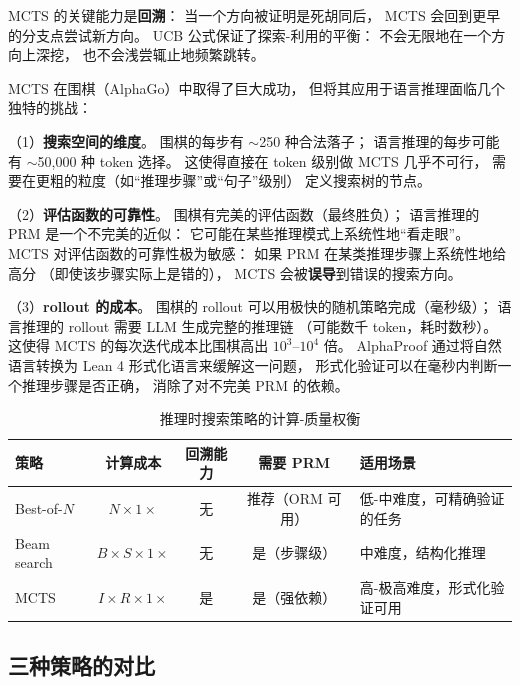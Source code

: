 MCTS 的关键能力是\textbf{回溯}：
当一个方向被证明是死胡同后，
MCTS 会回到更早的分支点尝试新方向。
UCB 公式保证了探索-利用的平衡：
不会无限地在一个方向上深挖，
也不会浅尝辄止地频繁跳转。

\begin{whybox}
MCTS 在围棋（AlphaGo）中取得了巨大成功，
但将其应用于语言推理面临几个独特的挑战：

（1）\textbf{搜索空间的维度}。
围棋的每步有 $\sim$250 种合法落子；
语言推理的每步可能有 $\sim$50,000 种 token 选择。
这使得直接在 token 级别做 MCTS 几乎不可行，
需要在更粗的粒度（如“推理步骤”或“句子”级别）
定义搜索树的节点。

（2）\textbf{评估函数的可靠性}。
围棋有完美的评估函数（最终胜负）；
语言推理的 PRM 是一个不完美的近似：
它可能在某些推理模式上系统性地“看走眼”。
MCTS 对评估函数的可靠性极为敏感：
如果 PRM 在某类推理步骤上系统性地给高分
（即使该步骤实际上是错的），
MCTS 会被\textbf{误导}到错误的搜索方向。

（3）\textbf{rollout 的成本}。
围棋的 rollout 可以用极快的随机策略完成（毫秒级）；
语言推理的 rollout 需要 LLM 生成完整的推理链
（可能数千 token，耗时数秒）。
这使得 MCTS 的每次迭代成本比围棋高出 $10^3$--$10^4$ 倍。
AlphaProof 通过将自然语言转换为 Lean 4 形式化语言来缓解这一问题，
形式化验证可以在毫秒内判断一个推理步骤是否正确，
消除了对不完美 PRM 的依赖。
\end{whybox}

\begin{table}[H]
\centering\small
\renewcommand{\arraystretch}{1.3}
\caption{推理时搜索策略的计算-质量权衡}\label{tab:search-strategies}
\begin{tabularx}{\linewidth}{l c c c X}
\toprule
\rowcolor{figLightGray}
\textbf{策略} & \textbf{计算成本} & \textbf{回溯能力} & \textbf{需要 PRM} & \textbf{适用场景} \\
\midrule
Best-of-$N$ & $N \times 1\times$ & 无 & 推荐（ORM 可用） & 低-中难度，可精确验证的任务 \\
Beam search & $B \times S \times 1\times$ & 无 & 是（步骤级） & 中难度，结构化推理 \\
MCTS & $I \times R \times 1\times$ & 是 & 是（强依赖） & 高-极高难度，形式化验证可用 \\
\bottomrule
\end{tabularx}
\end{table}

\subsection{三种策略的对比}


